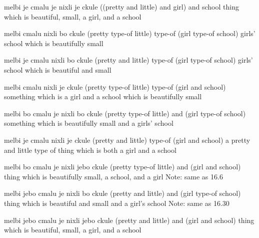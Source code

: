 \begin{example}
melbi je cmalu je nixli je ckule\n
((pretty and little) and girl) and school\n
thing which is beautiful, small, a girl, and a school
\end{example}

\begin{example}
melbi cmalu nixli bo ckule\n
(pretty type-of little) type-of (girl type-of school)\n
girls' school which is beautifully small
\end{example}

\begin{example}
melbi je cmalu nixli bo ckule\n
(pretty and little) type-of (girl type-of school)\n
girls' school which is beautiful and small
\end{example}

\begin{example}
melbi cmalu nixli je ckule\n
(pretty type-of little) type-of (girl and school)\n
something which is a girl and a school\n
\T	which is beautifully small
\end{example}

\begin{example}
melbi bo cmalu je nixli bo ckule\n
(pretty type-of little) and (girl type-of school)\n
something which is beautifully small and a girls' school
\end{example}

\begin{example}
melbi je cmalu nixli je ckule\n
(pretty and little) type-of (girl and school)\n
a pretty and little type of thing which is\n
\T	both a girl and a school
\end{example}

\begin{example}
melbi bo cmalu je nixli jebo ckule\n
(pretty type-of little) and (girl and school)\n
thing which is beautifully small, a school, and a girl\n
Note: same as 16.6
\end{example}

\begin{example}
melbi jebo cmalu je nixli bo ckule\n
(pretty and little) and (girl type-of school)\n
thing which is beautiful and small and a girl's school\n
Note: same as 16.30
\end{example}

\begin{example}
melbi jebo cmalu je nixli jebo ckule\n
(pretty and little) and (girl and school)\n
thing which is beautiful, small, a girl, and a school
\end{example}

